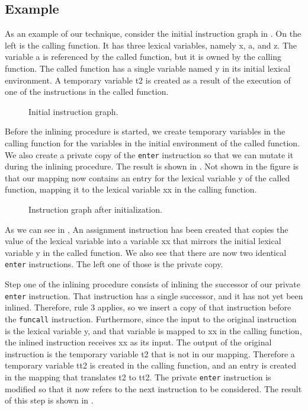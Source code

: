 \subsection{Example}

As an example of our technique, consider the initial instruction graph
in .  On the left is the calling function.  It has three
lexical variables, namely x, a, and z.  The variable a is referenced by
the called function, but it is owned by the calling function.  The
called function has a single variable named y in its initial lexical
environment.  A temporary variable t2 is created as a result of the
execution of one of the instructions in the called function.

\begin{figure}
\begin{center}
\end{center}
\caption{\label{fig31}
Initial instruction graph.}
\end{figure}

Before the inlining procedure is started, we create temporary
variables in the calling function for the variables in the initial
environment of the called function.  We also create a private copy of
the \texttt{enter} instruction so that we can mutate it during the
inlining procedure.  The result is shown in .  Not shown
in the figure is that our mapping now contains an entry for the
lexical variable y of the called function, mapping it to the lexical
variable xx in the calling function.

\begin{figure}
\begin{center}
\end{center}
\caption{\label{fig32}
Instruction graph after initialization.}
\end{figure}

As we can see in , An assignment instruction has been
created that copies the value of the lexical variable into a variable
xx that mirrors the initial lexical variable y in the called
function.  We also see that there are now two identical \texttt{enter}
instructions.  The left one of those is the private copy.

Step one of the inlining procedure consists of inlining the successor
of our private \texttt{enter} instruction.  That instruction has a
single successor, and it has not yet been inlined.  Therefore, rule 3
applies, so we insert a copy of that instruction before the
\texttt{funcall} instruction.  Furthermore, since the input to the
original instruction is the lexical variable y, and that variable is
mapped to xx in the calling function, the inlined instruction receives
xx as its input.  The output of the original instruction is the
temporary variable t2 that is not in our mapping.  Therefore a
temporary variable tt2 is created in the calling function, and an
entry is created in the mapping that translates t2 to tt2.  The
private \texttt{enter} instruction is modified so that it now refers
to the next instruction to be considered.  The result of this step is
shown in .

